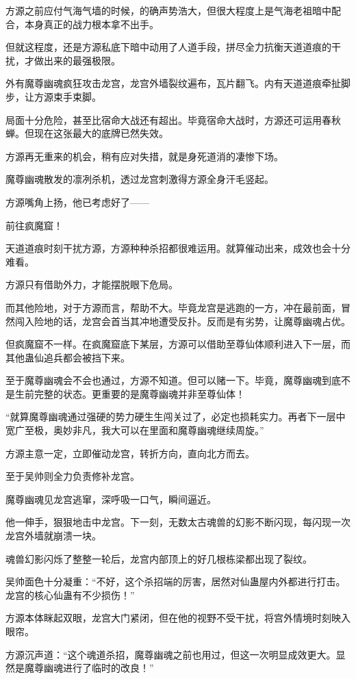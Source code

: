 \begin{this_body}
方源之前应付气海气墙的时候，的确声势浩大，但很大程度上是气海老祖暗中配合，本身真正的战力根本拿不出手。

但就这程度，还是方源私底下暗中动用了人道手段，拼尽全力抗衡天道道痕的干扰，才做出来的最强极限。

外有魔尊幽魂疯狂攻击龙宫，龙宫外墙裂纹遍布，瓦片翻飞。内有天道道痕牵扯脚步，让方源束手束脚。

局面十分危险，甚至比宿命大战还有超出。毕竟宿命大战时，方源还可运用春秋蝉。但现在这张最大的底牌已然失效。

方源再无重来的机会，稍有应对失措，就是身死道消的凄惨下场。

魔尊幽魂散发的凛冽杀机，透过龙宫刺激得方源全身汗毛竖起。

方源嘴角上扬，他已考虑好了——

前往疯魔窟！

天道道痕时刻干扰方源，方源种种杀招都很难运用。就算催动出来，成效也会十分难看。

方源只有借助外力，才能摆脱眼下危局。

而其他险地，对于方源而言，帮助不大。毕竟龙宫是逃跑的一方，冲在最前面，冒然闯入险地的话，龙宫会首当其冲地遭受反扑。反而是有劣势，让魔尊幽魂占优。

但疯魔窟不一样。在疯魔窟底下某层，方源可以借助至尊仙体顺利进入下一层，而其他蛊仙追兵都会被挡下来。

至于魔尊幽魂会不会也通过，方源不知道。但可以赌一下。毕竟，魔尊幽魂到底不是生前完整的状态。更重要的是魔尊幽魂并非至尊仙体！

“就算魔尊幽魂通过强硬的势力硬生生闯关过了，必定也损耗实力。再者下一层中宽广至极，奥妙非凡，我大可以在里面和魔尊幽魂继续周旋。”

方源主意一定，立即催动龙宫，转折方向，直向北方而去。

至于吴帅则全力负责修补龙宫。

魔尊幽魂见龙宫逃窜，深呼吸一口气，瞬间逼近。

他一伸手，狠狠地击中龙宫。下一刻，无数太古魂兽的幻影不断闪现，每闪现一次龙宫外墙就崩溃一块。

魂兽幻影闪烁了整整一轮后，龙宫内部顶上的好几根栋梁都出现了裂纹。

吴帅面色十分凝重：“不好，这个杀招端的厉害，居然对仙蛊屋内外都进行打击。龙宫的核心仙蛊有不少损伤！”

方源本体眯起双眼，龙宫大门紧闭，但在他的视野不受干扰，将宫外情境时刻映入眼帘。

方源沉声道：“这个魂道杀招，魔尊幽魂之前也用过，但这一次明显成效更大。显然是魔尊幽魂进行了临时的改良！”


\end{this_body}
